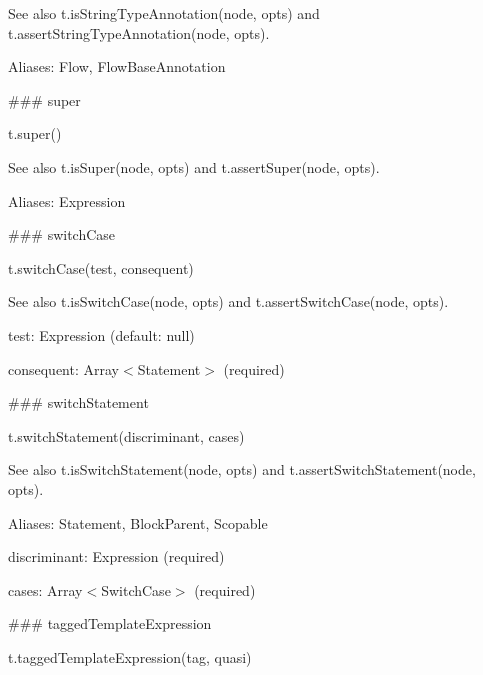 See also {\ttfamily t.\+is\+String\+Type\+Annotation(node, opts)} and {\ttfamily t.\+assert\+String\+Type\+Annotation(node, opts)}.

Aliases\+: {\ttfamily Flow}, {\ttfamily Flow\+Base\+Annotation}





\#\#\# super 
\begin{DoxyCode}
t.super()
\end{DoxyCode}


See also {\ttfamily t.\+is\+Super(node, opts)} and {\ttfamily t.\+assert\+Super(node, opts)}.

Aliases\+: {\ttfamily Expression}





\#\#\# switch\+Case 
\begin{DoxyCode}
t.switchCase(test, consequent)
\end{DoxyCode}


See also {\ttfamily t.\+is\+Switch\+Case(node, opts)} and {\ttfamily t.\+assert\+Switch\+Case(node, opts)}.


\begin{DoxyItemize}
\item {\ttfamily test}\+: {\ttfamily Expression} (default\+: {\ttfamily null})
\item {\ttfamily consequent}\+: {\ttfamily Array$<$Statement$>$} (required) 


\end{DoxyItemize}

\#\#\# switch\+Statement 
\begin{DoxyCode}
t.switchStatement(discriminant, cases)
\end{DoxyCode}


See also {\ttfamily t.\+is\+Switch\+Statement(node, opts)} and {\ttfamily t.\+assert\+Switch\+Statement(node, opts)}.

Aliases\+: {\ttfamily Statement}, {\ttfamily Block\+Parent}, {\ttfamily Scopable}


\begin{DoxyItemize}
\item {\ttfamily discriminant}\+: {\ttfamily Expression} (required)
\item {\ttfamily cases}\+: {\ttfamily Array$<$Switch\+Case$>$} (required) 


\end{DoxyItemize}

\#\#\# tagged\+Template\+Expression 
\begin{DoxyCode}
t.taggedTemplateExpression(tag, quasi)
\end{DoxyCode}


